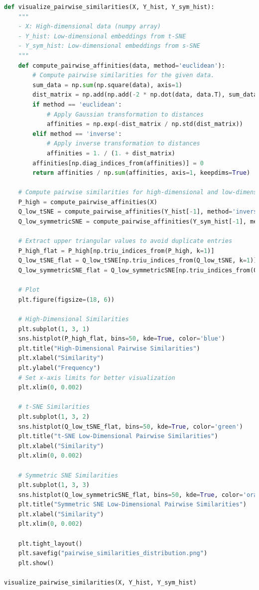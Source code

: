 \documentclass{homework}
\begin{document}
\begin{lstlisting}[language=Python]
def visualize_pairwise_similarities(X, Y_hist, Y_sym_hist):
    """
    - X: High-dimensional data (numpy array)
    - Y_hist: Low-dimensional embeddings from t-SNE
    - Y_sym_hist: Low-dimensional embeddings from s-SNE
    """
    def compute_pairwise_affinities(data, method='euclidean'):
        # Compute pairwise similarities for the given data.
        sum_data = np.sum(np.square(data), axis=1)
        dist_matrix = np.add(np.add(-2 * np.dot(data, data.T), sum_data).T, sum_data)
        if method == 'euclidean':
            # Apply Gaussian transformation to distances
            affinities = np.exp(-dist_matrix / np.std(dist_matrix))
        elif method == 'inverse':
            # Apply inverse transformation to distances
            affinities = 1. / (1. + dist_matrix)
        affinities[np.diag_indices_from(affinities)] = 0
        return affinities / np.sum(affinities, axis=1, keepdims=True)

    # Compute pairwise similarities for high-dimensional and low-dimensional data
    P_high = compute_pairwise_affinities(X)
    Q_low_tSNE = compute_pairwise_affinities(Y_hist[-1], method='inverse')
    Q_low_symmetricSNE = compute_pairwise_affinities(Y_sym_hist[-1], method='euclidean')

    # Extract upper triangular values to avoid duplicate entries
    P_high_flat = P_high[np.triu_indices_from(P_high, k=1)]
    Q_low_tSNE_flat = Q_low_tSNE[np.triu_indices_from(Q_low_tSNE, k=1)]
    Q_low_symmetricSNE_flat = Q_low_symmetricSNE[np.triu_indices_from(Q_low_symmetricSNE, k=1)]

    # Plot
    plt.figure(figsize=(18, 6))
    
    # High-Dimensional Similarities
    plt.subplot(1, 3, 1)
    sns.histplot(P_high_flat, bins=50, kde=True, color='blue')
    plt.title("High-Dimensional Pairwise Similarities")
    plt.xlabel("Similarity")
    plt.ylabel("Frequency")
    # Set x-axis limits for better visualization
    plt.xlim(0, 0.002)

    # t-SNE Similarities
    plt.subplot(1, 3, 2)
    sns.histplot(Q_low_tSNE_flat, bins=50, kde=True, color='green')
    plt.title("t-SNE Low-Dimensional Pairwise Similarities")
    plt.xlabel("Similarity")
    plt.xlim(0, 0.002)

    # Symmetric SNE Similarities
    plt.subplot(1, 3, 3)
    sns.histplot(Q_low_symmetricSNE_flat, bins=50, kde=True, color='orange')
    plt.title("Symmetric SNE Low-Dimensional Pairwise Similarities")
    plt.xlabel("Similarity")
    plt.xlim(0, 0.002)

    plt.tight_layout()
    plt.savefig("pairwise_similarities_distribution.png")
    plt.show()

visualize_pairwise_similarities(X, Y_hist, Y_sym_hist)
\end{lstlisting}
\end{document}
